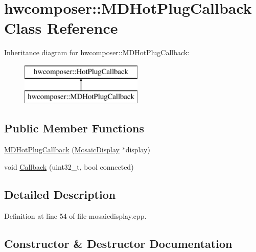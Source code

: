 \hypertarget{classhwcomposer_1_1MDHotPlugCallback}{}\section{hwcomposer\+:\+:M\+D\+Hot\+Plug\+Callback Class Reference}
\label{classhwcomposer_1_1MDHotPlugCallback}
Inheritance diagram for hwcomposer\+:\+:M\+D\+Hot\+Plug\+Callback\+:\begin{figure}[H]
\begin{center}
\leavevmode
\includegraphics[height=2.000000cm]{classhwcomposer_1_1MDHotPlugCallback}
\end{center}
\end{figure}
\subsection*{Public Member Functions}
\begin{DoxyCompactItemize}
\item 
\mbox{\hyperlink{classhwcomposer_1_1MDHotPlugCallback_a5db491310051345bdf33332da48c581b}{M\+D\+Hot\+Plug\+Callback}} (\mbox{\hyperlink{classhwcomposer_1_1MosaicDisplay}{Mosaic\+Display}} $\ast$display)
\item 
void \mbox{\hyperlink{classhwcomposer_1_1MDHotPlugCallback_a56a4bfc5b98f35a0c27aa97afb119a7a}{Callback}} (uint32\+\_\+t, bool connected)
\end{DoxyCompactItemize}


\subsection{Detailed Description}


Definition at line 54 of file mosaicdisplay.\+cpp.



\subsection{Constructor \& Destructor Documentation}
\mbox{\label{classhwcomposer_1_1MDHotPlugCallback_a5db491310051345bdf33332da48c581b}} 
